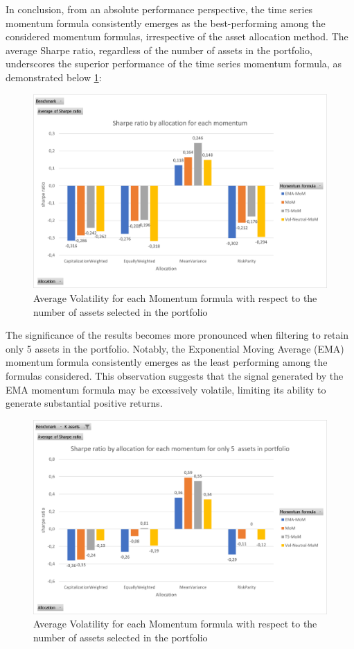 \documentclass{article}
\begin{document}
In conclusion, from an absolute performance perspective, the time series momentum formula consistently emerges as the best-performing among the considered momentum formulas, irrespective of the asset allocation method. The average Sharpe ratio, regardless of the number of assets in the portfolio, underscores the superior performance of the time series momentum formula, as demonstrated below \ref{fig:sharpe_by_aloc_for_all_mom}: 
\begin{figure}[H] %
    \centering
    \includegraphics[width=0.75\linewidth]{absolute_management/sharpe_by_aloc_for_all_mom.png}
    \caption{Average Volatility for each Momentum formula with respect to the number of assets selected in the portfolio}
    \label{fig:sharpe_by_aloc_for_all_mom}
\end{figure}

The significance of the results becomes more pronounced when filtering to retain only 5 assets in the portfolio. Notably, the Exponential Moving Average (EMA) momentum formula consistently emerges as the least performing among the formulas considered. This observation suggests that the signal generated by the EMA momentum formula may be excessively volatile, limiting its ability to generate substantial positive returns.

\begin{figure}[H] %
    \centering
    \includegraphics[width=0.75\linewidth]{absolute_management/sharpe_by_aloc_for_all_mom_5_assets.png}
    \caption{Average Volatility for each Momentum formula with respect to the number of assets selected in the portfolio}
    \label{fig:sharpe_by_aloc_for_all_mom5assets}
\end{figure}
\end{document}

